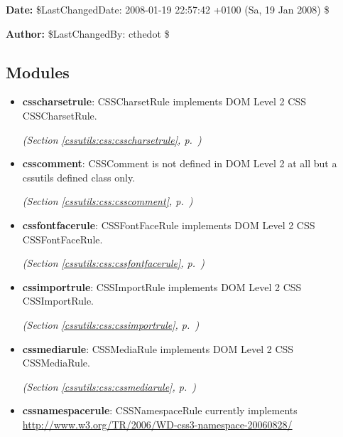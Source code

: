 \textbf{Date:} \$LastChangedDate: 2008-01-19 22:57:42 +0100 (Sa, 19 Jan 2008) \$



\textbf{Author:} \$LastChangedBy: cthedot \$





\subsection{Modules}

\begin{itemize}
\setlength{\parskip}{0ex}
\item \textbf{csscharsetrule}: 
CSSCharsetRule implements DOM Level 2 CSS CSSCharsetRule.


  \textit{(Section \ref{cssutils:css:csscharsetrule}, p.~\pageref{cssutils:css:csscharsetrule})}

\item \textbf{csscomment}: 
CSSComment is not defined in DOM Level 2 at all but a cssutils defined
class only.


  \textit{(Section \ref{cssutils:css:csscomment}, p.~\pageref{cssutils:css:csscomment})}

\item \textbf{cssfontfacerule}: 
CSSFontFaceRule implements DOM Level 2 CSS CSSFontFaceRule.


  \textit{(Section \ref{cssutils:css:cssfontfacerule}, p.~\pageref{cssutils:css:cssfontfacerule})}

\item \textbf{cssimportrule}: 
CSSImportRule implements DOM Level 2 CSS CSSImportRule.


  \textit{(Section \ref{cssutils:css:cssimportrule}, p.~\pageref{cssutils:css:cssimportrule})}

\item \textbf{cssmediarule}: 
CSSMediaRule implements DOM Level 2 CSS CSSMediaRule.


  \textit{(Section \ref{cssutils:css:cssmediarule}, p.~\pageref{cssutils:css:cssmediarule})}

\item \textbf{cssnamespacerule}: 
CSSNamespaceRule currently implements
\href{http://www.w3.org/TR/2006/WD-css3-namespace-20060828/}{http://www.w3.org/TR/2006/WD-css3-namespace-20060828/}



\end{itemize}
